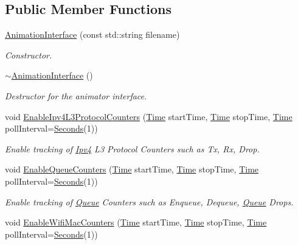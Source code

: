 \subsection*{Public Member Functions}
\begin{DoxyCompactItemize}
\item 
\hyperlink{classns3_1_1AnimationInterface_a88af7da6eb605ec7e9d8cb3fcc8a6466}{Animation\+Interface} (const std\+::string filename)
\begin{DoxyCompactList}\small\item\em Constructor. \end{DoxyCompactList}\item 
\hyperlink{classns3_1_1AnimationInterface_a63248fb25265fb08e3812863a7329488}{$\sim$\+Animation\+Interface} ()
\begin{DoxyCompactList}\small\item\em Destructor for the animator interface. \end{DoxyCompactList}\item 
void \hyperlink{classns3_1_1AnimationInterface_a4c348971ef3ec69828cf81ecb6dea2c4}{Enable\+Ipv4\+L3\+Protocol\+Counters} (\hyperlink{classns3_1_1Time}{Time} start\+Time, \hyperlink{classns3_1_1Time}{Time} stop\+Time, \hyperlink{classns3_1_1Time}{Time} poll\+Interval=\hyperlink{group__timecivil_ga33c34b816f8ff6628e33d5c8e9713b9e}{Seconds}(1))
\begin{DoxyCompactList}\small\item\em Enable tracking of \hyperlink{classns3_1_1Ipv4}{Ipv4} L3 Protocol Counters such as Tx, Rx, Drop. \end{DoxyCompactList}\item 
void \hyperlink{classns3_1_1AnimationInterface_ae521d5b7b73a3dbc990d8660a2f978a9}{Enable\+Queue\+Counters} (\hyperlink{classns3_1_1Time}{Time} start\+Time, \hyperlink{classns3_1_1Time}{Time} stop\+Time, \hyperlink{classns3_1_1Time}{Time} poll\+Interval=\hyperlink{group__timecivil_ga33c34b816f8ff6628e33d5c8e9713b9e}{Seconds}(1))
\begin{DoxyCompactList}\small\item\em Enable tracking of \hyperlink{classns3_1_1Queue}{Queue} Counters such as Enqueue, Dequeue, \hyperlink{classns3_1_1Queue}{Queue} Drops. \end{DoxyCompactList}\item 
void \hyperlink{classns3_1_1AnimationInterface_aa3c65722df896f7ebd0543bbe8d8be4b}{Enable\+Wifi\+Mac\+Counters} (\hyperlink{classns3_1_1Time}{Time} start\+Time, \hyperlink{classns3_1_1Time}{Time} stop\+Time, \hyperlink{classns3_1_1Time}{Time} poll\+Interval=\hyperlink{group__timecivil_ga33c34b816f8ff6628e33d5c8e9713b9e}{Seconds}(1))

\end{DoxyCompactItemize}
